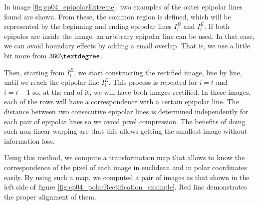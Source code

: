 \begin{center}
\begin{tabular}{cc}
\end{tabular}
\label{fig:cp04_epipolarExtreme}
\end{center}


In image \ref{fig:cp04_epipolarExtreme}, two examples of the outer epipolar lines found are shown. From these, the common region is defined, which will be represented by the beginning and ending epipolar lines $I_i^B$ and $I_i^E$. If both epipoles are inside the image, an arbitrary epipolar line can be used. In that case, we can avoid boundary effects by adding a small overlap. That is, we use a little bit more from $360\textdegree$.

Then, starting from $I_i^B$, we start constructing the rectified image, line by line, until we reach the epipolar line $I_i^E$. This process is repeated for $i=t$ and $i=t-1$ so, at the end of it, we will have both images rectified. In these images, each of the rows will have a correspondence with a certain epipolar line. The distance between two consecutive epipolar lines is determined independently for each pair of epipolar lines so we avoid pixel compression. The benefits of doing such non-linear warping are that this allows getting the smallest image without information loss.

Using this method, we compute a transformation map that allows to know the correspondence of the pixel of each image in euclidean and in polar coordinates easily. By using such a map, we computed a pair of images as that shown in the left side of figure \ref{fig:cp04_polarRectification_example}. Red line demonstrates the proper alignment of them. 

